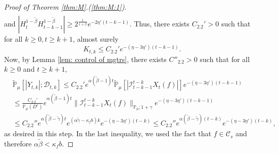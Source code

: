 \documentclass[EJP]{ejpecp} %
\begin{document}
\begin{proof}[Proof of Theorem \ref{thm:M}.(\ref{thm:M:1})]
\begin{align}
\end{align}
	and $ |H_t^{1 - \tilde \beta} H_{t-k-1}^{ 1 - \tilde \beta}| \geq 2^{\frac{1}{1+\beta}} e^{-2\eta'(t-k-1)}$.
	Thus, there exists $C_{2.2}'> 0$ such that for all $k \geq 0, t\geq k+1$, almost surely
\[
    K_{t,k}
    \leq C_{2.2}' e^{-(\eta - 3\eta')(t-k-1)}.
\]
 	Now, by Lemma \ref{lem: control of mgtrs}, there exists $C''_{2.2}>0$ such that for all $k\geq 0$ and $t\geq k+1$,
\begin{align}
	\label{eq: Y in D}
    & \mathbb{\widetilde{P}}_{\mu} [|Y_{t,k}| ; \mathcal{D}_{t,k} ]
    \leq C_{2.2}' e^{\alpha (\tilde \beta - 1)t} \mathbb{\widetilde{P}}_{\mu} [ | \mathcal{I}_{t-k-1}^{t-k}X_t(f)| ] e^{-(\eta - 3\eta')(t-k-1)} \\
    & \leq \frac{C_{2.2}' } {\mathbb{P}_{\mu}(D^c)} e^{ \alpha (\tilde \beta - 1)t} \|\mathcal{I}_{t-k-1}^{t-k} X_t(f)\|_{\mathbb P_\mu; 1+\gamma} e^{-(\eta - 3\eta')(t-k - 1)} \\
    & \leq C_{2.2}'' e^{\alpha(\tilde \beta - \tilde \gamma)t} e^{ (\alpha \tilde \gamma - \kappa_f b)k} e^{-(\eta - 3\eta')(t-k)}
    \leq C_{2.2}'' e^{\alpha(\tilde \beta - \tilde \gamma)(t-k)} e^{-(\eta - 3\eta')(t-k)},
\end{align}
	as desired in this step.
	In the last inequality, we used the fact that $f\in \mathcal C_s$ and therefore $\alpha \tilde \beta < \kappa_f b$.


\end{proof}
\end{document}
